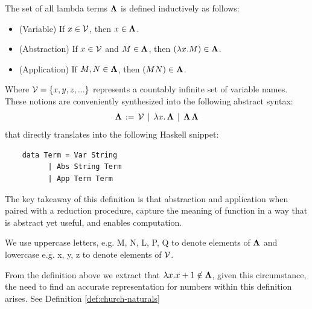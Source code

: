 \begin{definition} The set of all lambda terms \( \mathbf{\Lambda} \) is defined inductively as follows:
  \label{def:lambda-terms-1}
  \begin{itemize}
  \item (Variable) If \( x \in \mathcal{V} \), then \( x \in \mathbf{\Lambda} \).
  \item (Abstraction) If \( x \in \mathcal{V} \) and \( M \in \mathbf{\Lambda} \), then \( (\lambda x. M) \in \mathbf{\Lambda} \).
  \item (Application) If \( M, N \in \mathbf{\Lambda} \), then \((M N) \in \mathbf{\Lambda} \).
  \end{itemize}
  Where $\mathcal{V} = \{x, y, z, ... \}$ represents a countably infinite set of variable names. These notions are conveniently synthesized into the following abstract syntax:
  \[
    \mathbf{\Lambda} \, := \, \mathcal{V} \, \mid \, \lambda x . \, \mathbf{\Lambda} \, \mid \, \mathbf{\Lambda} \, \mathbf{\Lambda}
  \]
  \noindent
  that directly translates into the following Haskell snippet:
  \begin{verbatim}
    data Term = Var String
          | Abs String Term
          | App Term Term
  \end{verbatim}
\end{definition}

The key takeaway of this definition is that abstraction and application when paired with a reduction procedure, capture the meaning of function in a way that is abstract yet useful, and enables computation.

\begin{notation}
  We use uppercase letters, e.g. M, N, L, P, Q to denote elements of $\mathbf{\Lambda}$ and lowercase e.g. x, y, z to denote elements of $\mathcal{V}$.
\end{notation}

\begin{remark}
  From the definition above we extract that \( \lambda x . x + 1 \notin \mathbf{\Lambda} \), given this circumstance, the need to find an accurate representation for numbers within this definition arises. See Definition \ref{def:church-naturals}
\end{remark}

